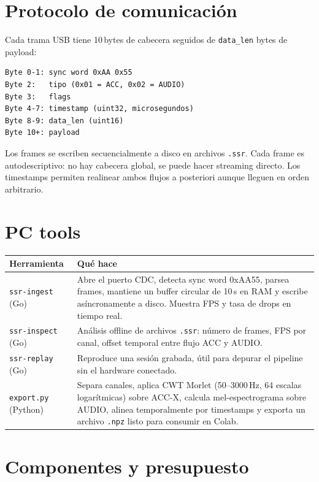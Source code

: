 \documentclass[10pt,a4paper]{article}
\begin{document}
\section{Protocolo de comunicación}

Cada trama USB tiene 10\,bytes de cabecera seguidos de \texttt{data\_len} bytes
de payload:

\begin{lstlisting}[style=mini]
Byte 0-1: sync word 0xAA 0x55
Byte 2:   tipo (0x01 = ACC, 0x02 = AUDIO)
Byte 3:   flags
Byte 4-7: timestamp (uint32, microsegundos)
Byte 8-9: data_len (uint16)
Byte 10+: payload
\end{lstlisting}

Los frames se escriben secuencialmente a disco en archivos \texttt{.ssr}.
Cada frame es autodescriptivo: no hay cabecera global, se puede hacer
streaming directo. Los timestamps permiten realinear ambos flujos
a posteriori aunque lleguen en orden arbitrario.

\section{PC tools}

\begin{tabularx}{\textwidth}{l X}
\toprule
\textbf{Herramienta} & \textbf{Qué hace} \\
\midrule
\texttt{ssr-ingest} (Go) & Abre el puerto CDC, detecta sync word 0xAA55,
parsea frames, mantiene un buffer circular de 10\,s en RAM y escribe
asíncronamente a disco. Muestra FPS y tasa de drops en tiempo real.\\
\texttt{ssr-inspect} (Go) & Análisis offline de archivos \texttt{.ssr}:
número de frames, FPS por canal, offset temporal entre flujo ACC y AUDIO.\\
\texttt{ssr-replay} (Go) & Reproduce una sesión grabada, útil para depurar
el pipeline sin el hardware conectado.\\
\texttt{export.py} (Python) & Separa canales, aplica CWT Morlet (50--3000\,Hz,
64 escalas logarítmicas) sobre ACC-X, calcula mel-espectrograma sobre AUDIO,
alinea temporalmente por timestamps y exporta un archivo \texttt{.npz}
listo para consumir en Colab.\\
\bottomrule
\end{tabularx}

\section{Componentes y presupuesto}
\end{document}
